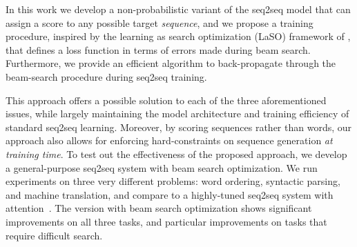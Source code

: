 In this work we develop a non-probabilistic variant of the seq2seq
model that can assign a score to any possible target
\textit{sequence}, and we propose a training procedure, inspired by the learning
as search optimization (LaSO) framework of ,
that defines a loss function in terms of errors made during beam
search. Furthermore, we provide an efficient algorithm to
back-propagate through the beam-search procedure during seq2seq
training.

This approach offers a possible solution to each of the three
aforementioned issues, while largely maintaining the model architecture and
training efficiency of standard seq2seq learning. Moreover, by scoring sequences rather than words, our approach also allows for enforcing hard-constraints on sequence generation \textit{at training time}. To test out the effectiveness of the proposed approach, we develop a general-purpose seq2seq system with beam
search optimization. We run experiments on three very different
problems: word ordering, syntactic parsing, and machine
translation, and compare to a highly-tuned seq2seq system with
attention~\cite{luong15effective}. The version with beam search optimization shows
significant improvements on all three tasks, and particular
improvements on tasks that require difficult search. 


%

